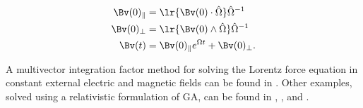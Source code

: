 \begin{dmath}\label{eqn:lorentzForce:220}
\begin{aligned}
\Bv(0)_\parallel &= \lr{ \Bv(0) \cdot \hat{\Omega} } \hat{\Omega}^{-1} \\
\Bv(0)_\perp &= \lr{ \Bv(0) \wedge \hat{\Omega} } \hat{\Omega}^{-1} \\
\Bv(t) &= \Bv(0)_\parallel e^{\Omega t} + \Bv(0)_\perp.
\end{aligned}
\end{dmath}

A multivector integration factor method for solving the Lorentz force equation in constant external electric and magnetic fields can be found in \citep{hestenes1999nfc}.  Other examples, solved using a relativistic formulation of GA, can be found in \citep{doran2003gap},
\citep{hestenes1974properdynamics}, and
\citep{hestenes1974propermechanics}.
